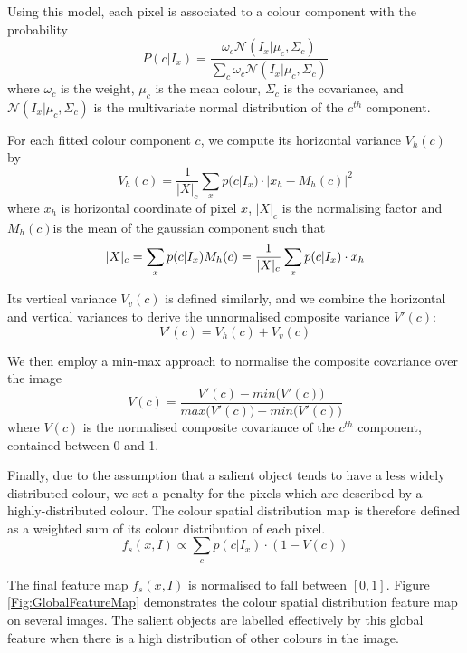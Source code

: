 \documentclass[10pt,twocolumn,letterpaper]{article}
\newcommand{\SUM}{\sum\limits}
\begin{document}
Using this model, each pixel is associated to a colour component with the probability $$P(c|I_x) = \frac{\omega_c\mathcal{N}(I_x|\mu_c,\Sigma_c)}{\SUM_c \omega_c \mathcal{N}(I_x|\mu_c,\Sigma_c)}$$where $\omega_c$ is the weight, $\mu_c$ is the mean colour, $\Sigma_c$ is the covariance, and $\mathcal N(I_x|\mu_c,\Sigma_c)$ is the multivariate normal distribution of the $c^{th}$ component. 

For each fitted colour component $c$, we compute its horizontal variance $V_{h}(c)$ by $$V_{h}(c) = \frac{1}{|X|_{c}} \sum_{x} p (c|I_{x}) \cdot | x_{h} - M_{h}(c) |^{2}$$where $x_h$ is horizontal coordinate of pixel $x$, $|X|_c$ is the normalising factor and $M_h (c)$is the mean of the gaussian component such that $$|X|_c = \sum_x p(c|I_x)\\M_h (c) = \frac{1}{|X|_c} \sum_{x} p(c|I_x) \cdot x_h$$

Its vertical variance $V_{v}(c)$ is defined similarly, and we combine the horizontal and vertical variances to derive the unnormalised composite variance $V'(c)$:$$V' (c) = V_h (c) + V_v (c) $$

We then employ a min-max approach to normalise the composite covariance over the image$$V (c) = \frac{V'(c) - min \big(V'(c)\big) }{max \big(V'(c)\big) - min \big(V'(c)\big)}$$where $V(c)$ is the normalised composite covariance of the $c^{th}$ component, contained between 0 and 1.

Finally, due to the assumption that a salient object tends to have a less widely distributed colour, we set a penalty for the pixels which are described by a highly-distributed colour. The colour spatial distribution map is therefore defined as a weighted sum of its colour distribution of each pixel.$$f_s(x,I)\propto\SUM_c p(c|I_x)\cdot(1-V(c))$$

The final feature map $f_s (x,I)$ is normalised to fall between $[0, 1]$. Figure \ref{Fig:GlobalFeatureMap} demonstrates the colour spatial distribution feature map on several images. The salient objects are labelled effectively by this global feature when there is a high distribution of other colours in the image.
\end{document}
